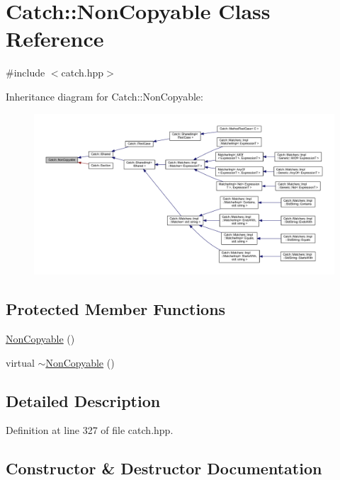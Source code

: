\hypertarget{class_catch_1_1_non_copyable}{}\section{Catch\+:\+:Non\+Copyable Class Reference}
\label{class_catch_1_1_non_copyable}


{\ttfamily \#include $<$catch.\+hpp$>$}



Inheritance diagram for Catch\+:\+:Non\+Copyable\+:\nopagebreak
\begin{figure}[H]
\begin{center}
\leavevmode
\includegraphics[width=350pt]{class_catch_1_1_non_copyable__inherit__graph}
\end{center}
\end{figure}
\subsection*{Protected Member Functions}
\begin{DoxyCompactItemize}
\item 
\hyperlink{class_catch_1_1_non_copyable_a4b492dd5753f9952350fb64dc6cb9fe2}{Non\+Copyable} ()
\item 
virtual \hyperlink{class_catch_1_1_non_copyable_a81254677280fef337eb4a676e91e3293}{$\sim$\+Non\+Copyable} ()
\end{DoxyCompactItemize}


\subsection{Detailed Description}


Definition at line 327 of file catch.\+hpp.



\subsection{Constructor \& Destructor Documentation}
\hypertarget{class_catch_1_1_non_copyable_a4b492dd5753f9952350fb64dc6cb9fe2}{}\label{class_catch_1_1_non_copyable_a4b492dd5753f9952350fb64dc6cb9fe2} 
